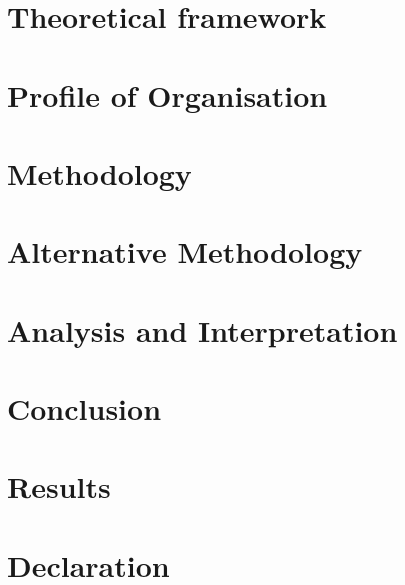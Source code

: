 \documentclass[12pt]{report}
\begin{document}
\chapter{Theoretical framework} \label{tf}


\chapter{Profile of Organisation}


\chapter{Methodology} \label{m}


\chapter{Alternative Methodology} \label{am}


\chapter{Analysis and Interpretation}\label{ai}


\chapter{Conclusion} \label{c}


\chapter{Results} \label{ra}




\chapter*{Declaration}

\end{document}
